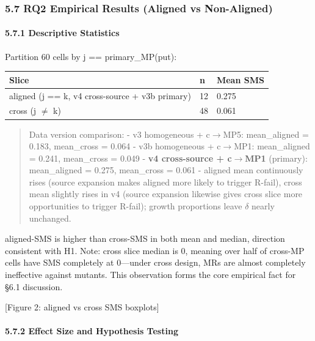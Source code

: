 \documentclass[review,12pt,authoryear]{elsarticle}
\begin{document}
\subsubsection{5.7 RQ2 Empirical Results (Aligned vs
Non-Aligned)}\label{rq2-empirical-results-aligned-vs-non-aligned}

\paragraph{5.7.1 Descriptive Statistics}\label{descriptive-statistics}

Partition 60 cells by j == primary\_MP(put):

{\def\LTcaptype{none} %
\begin{longtable}[]{@{}lll@{}}
\toprule\noalign{}
Slice & n & Mean SMS \\
\midrule\noalign{}
\endhead
\bottomrule\noalign{}
\endlastfoot
aligned (j == k, v4 cross-source + v3b primary) & 12 & 0.275 \\
cross (j $\neq$ k) & 48 & 0.061 \\
\end{longtable}
}

\begin{quote}
Data version comparison: - v3 homogeneous + c$\to$MP5: mean\_aligned =
0.183, mean\_cross = 0.064 - v3b homogeneous + c$\to$MP1: mean\_aligned =
0.241, mean\_cross = 0.049 - \textbf{v4 cross-source + c$\to$MP1} (primary):
mean\_aligned = 0.275, mean\_cross = 0.061 - aligned mean continuously
rises (source expansion makes aligned more likely to trigger R-fail),
cross mean slightly rises in v4 (source expansion likewise gives cross
slice more opportunities to trigger R-fail); growth proportions leave $\delta$
nearly unchanged.
\end{quote}

aligned-SMS is higher than cross-SMS in both mean and median, direction
consistent with H1. Note: cross slice median is 0, meaning over half of
cross-MP cells have SMS completely at 0---under cross design, MRs are
almost completely ineffective against mutants. This observation forms
the core empirical fact for §6.1 discussion.

{[}Figure 2: aligned vs cross SMS boxplots{]}

\paragraph{5.7.2 Effect Size and Hypothesis
Testing}\label{effect-size-and-hypothesis-testing}
\end{document}

